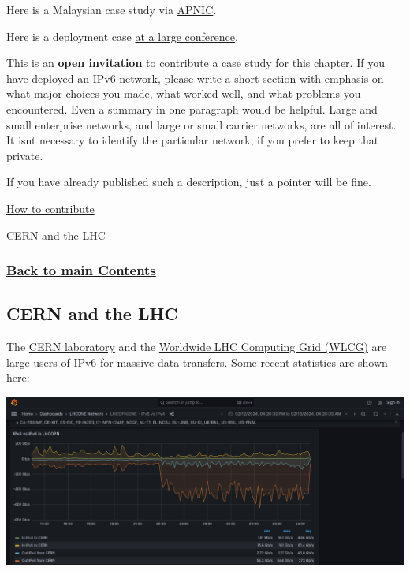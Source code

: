 \documentclass[
]{article}
\begin{document}
Here is a Malaysian case study via
\href{https://blog.apnic.net/2023/03/17/telekom-malaysias-ipv6-readiness-journey/}{APNIC}.

Here is a deployment case
\href{https://nsrc.org/blog/apricot-ipv6-only}{at a large conference}.

This is an \textbf{open invitation} to contribute a case study for this
chapter. If you have deployed an IPv6 network, please write a short
section with emphasis on what major choices you made, what worked well,
and what problems you encountered. Even a summary in one paragraph would
be helpful. Large and small enterprise networks, and large or small
carrier networks, are all of interest. It isn\textquotesingle t
necessary to identify the particular network, if you prefer to keep that
private.

If you have already published such a description, just a pointer will be
fine.

\href{https://github.com/becarpenter/book6/blob/main/1.\%20Introduction\%20and\%20Foreword/How\%20to\%20contribute.md\#how-to-contribute}{How
to contribute}

\hyperref[cern-and-the-lhc]{CERN and the LHC}

\subsubsection{\texorpdfstring{\hyperref[list-of-contents]{Back to main
Contents}}{Back to main Contents}}\label{back-to-main-contents-6}

\pagebreak

\subsection{CERN and the LHC}\label{cern-and-the-lhc}

The \href{https://www.cern.ch}{CERN laboratory} and the
\href{https://home.cern/science/computing/grid}{Worldwide LHC Computing
Grid (WLCG)} are large users of IPv6 for massive data transfers. Some
recent statistics are shown here:

\includegraphics{CERN-IPv6-Feb24.png}
\end{document}
